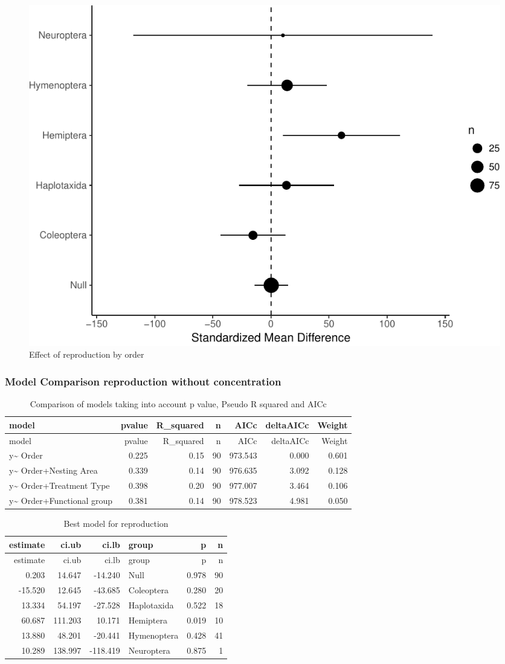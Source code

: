 \documentclass[]{elsarticle} %
\makeatletter
\def\maxwidth{\ifdim\Gin@nat@width>\linewidth\linewidth
\else\Gin@nat@width\fi}
\let\Oldincludegraphics\includegraphics
\renewcommand{\includegraphics}[1]{\Oldincludegraphics[width=\maxwidth]{#1}}
\makeatother
\begin{document}
\begin{figure}[htbp]
\centering
\includegraphics{MetanalysisNeonics_files/figure-latex/unnamed-chunk-19-1.pdf}
\caption{Effect of reproduction by order}
\end{figure}

\subsubsection{Model Comparison reproduction without
concentration}\label{model-comparison-reproduction-without-concentration}

\begin{longtable}[c]{@{}lrrrrrr@{}}
\caption{Comparison of models taking into account p value, Pseudo R
squared and AICc}\tabularnewline
\toprule
model & pvalue & R\_squared & n & AICc & deltaAICc &
Weight\tabularnewline
\midrule
\endfirsthead
\toprule
model & pvalue & R\_squared & n & AICc & deltaAICc &
Weight\tabularnewline
\midrule
\endhead
y\textasciitilde{} Order & 0.225 & 0.15 & 90 & 973.543 & 0.000 &
0.601\tabularnewline
y\textasciitilde{} Order+Nesting Area & 0.339 & 0.14 & 90 & 976.635 &
3.092 & 0.128\tabularnewline
y\textasciitilde{} Order+Treatment Type & 0.398 & 0.20 & 90 & 977.007 &
3.464 & 0.106\tabularnewline
y\textasciitilde{} Order+Functional group & 0.381 & 0.14 & 90 & 978.523
& 4.981 & 0.050\tabularnewline
\bottomrule
\end{longtable}

\begin{longtable}[c]{@{}rrrlrr@{}}
\caption{Best model for reproduction}\tabularnewline
\toprule
estimate & ci.ub & ci.lb & group & p & n\tabularnewline
\midrule
\endfirsthead
\toprule
estimate & ci.ub & ci.lb & group & p & n\tabularnewline
\midrule
\endhead
0.203 & 14.647 & -14.240 & Null & 0.978 & 90\tabularnewline
-15.520 & 12.645 & -43.685 & Coleoptera & 0.280 & 20\tabularnewline
13.334 & 54.197 & -27.528 & Haplotaxida & 0.522 & 18\tabularnewline
60.687 & 111.203 & 10.171 & Hemiptera & 0.019 & 10\tabularnewline
13.880 & 48.201 & -20.441 & Hymenoptera & 0.428 & 41\tabularnewline
10.289 & 138.997 & -118.419 & Neuroptera & 0.875 & 1\tabularnewline
\bottomrule
\end{longtable}
\end{document}
